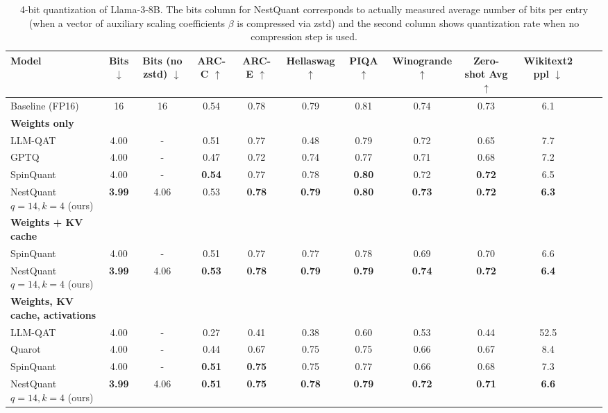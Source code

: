\begin{table*}[t]
\centering
\begin{adjustbox}{max width=2\columnwidth} %
\begin{tabular}{lccccccccccc}
    \toprule
\textbf{Model} & \textbf{Bits} $\downarrow$ & \textbf{Bits (no zstd)} $\downarrow$ & \textbf{ARC-C} $\uparrow$ & \textbf{ARC-E} $\uparrow$ & \textbf{Hellaswag} $\uparrow$ &  \textbf{PIQA} $\uparrow$ & \textbf{Winogrande} $\uparrow$ & \textbf{Zero-shot Avg} $\uparrow$ & \textbf{Wikitext2 ppl} $\downarrow$ \\ 
\midrule
    Baseline (FP16) & 16 & 16 & 0.54 & 0.78 & 0.79 & 0.81 & 0.74 & 0.73& 6.1\\
    \midrule
    \textbf{Weights only} \\
    LLM-QAT & 4.00 & - & 0.51 & 0.77 & 0.48 & 0.79 & 0.72 & 0.65 & 7.7\\
    GPTQ & 4.00 & - & 0.47 & 0.72 & 0.74 & 0.77 & 0.71 & 0.68 & 7.2\\
    SpinQuant          & 4.00& -&\textbf{0.54}& 0.77& 0.78 & \textbf{0.80}& 0.72& \textbf{0.72}& 6.5\\
    NestQuant $q=14,k=4$ (ours)           & \textbf{3.99}& 4.06 & 0.53 & \textbf{0.78} & \textbf{0.79} & \textbf{0.80} & \textbf{0.73} & \textbf{0.72}& \textbf{6.3}\\
    \midrule
    \textbf{Weights + KV cache} \\
    SpinQuant & 4.00& - & 0.51& 0.77& 0.77& 0.78& 0.69& 0.70& 6.6 \\
    NestQuant $q=14,k=4$ (ours)           & \textbf{3.99}& 4.06 & \textbf{0.53} & \textbf{0.78} & \textbf{0.79} &  \textbf{0.79} &\textbf{ 0.74} & \textbf{0.72}& \textbf{6.4}\\
    \midrule
    \textbf{Weights, KV cache, activations} \\
    LLM-QAT & 4.00 & - & 0.27 & 0.41 & 0.38 & 0.60 & 0.53 & 0.44 & 52.5 \\
    Quarot & 4.00& - & 0.44 & 0.67 & 0.75 & 0.75 & 0.66 & 0.67 & 8.4 \\
    SpinQuant & 4.00& - & \textbf{0.51}& \textbf{0.75}& 0.75&0.77& 0.66& 0.68& 7.3 \\
    NestQuant $q=14,k=4$ (ours)     & \textbf{3.99}& 4.06 & \textbf{0.51} & \textbf{0.75} & \textbf{0.78} & \textbf{0.79} & \textbf{0.72} & \textbf{0.71}& \textbf{6.6}\\
    \bottomrule
\end{tabular}
\end{adjustbox}
\caption{4-bit quantization of Llama-3-8B. The bits column for NestQuant corresponds to actually measured average number of bits per entry (when a vector of auxiliary scaling coefficients $\beta$ is compressed via zstd) and the second column shows quantization rate when no compression step is used.} 
\label{tab:llama3_8b}
\end{table*}